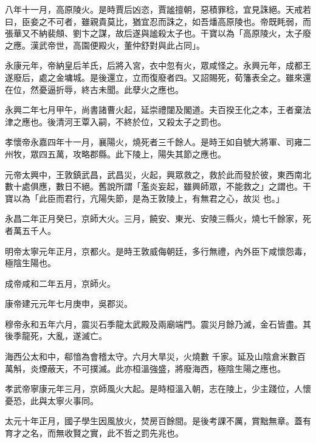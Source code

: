 \begin{pinyinscope}
 八年十一月，高原陵火。是時賈后凶恣，賈謐擅朝，惡積罪稔，宜見誅絕。天戒若曰，臣妾之不可者，雖親貴莫比，猶宜忍而誅之，如吾燔高原陵也。帝既眊弱，而張華又不納裴頠、劉卞之謀，故后遂與謐殺太子也。干寶以為「高原陵火，太子廢之應。漢武帝世，高園便殿火，董仲舒對與此占同」。



 永康元年，帝納皇后羊氏，后將入宮，衣中忽有火，眾咸怪之。永興元年，成都王遂廢后，處之金墉城。是後還立，立而復廢者四。又詔賜死，荀籓表全之。雖來還在位，然憂逼折辱，終古未聞。此孽火之應也。



 永興二年七月甲午，尚書諸曹火起，延崇禮闥及閣道。夫百揆王化之本，王者棄法津之應也。後清河王覃入嗣，不終於位，又殺太子之罰也。



 孝懷帝永嘉四年十一月，襄陽火，燒死者三千餘人。是時王如自號大將軍、司雍二州牧，眾四五萬，攻略郡縣。此下陵上，陽失其節之應也。



 元帝太興中，王敦鎮武昌，武昌災，火起，興眾救之，救於此而發於彼，東西南北數十處俱應，數日不絕。舊說所謂「濫炎妄起，雖興師眾，不能救之」之謂也。干寶以為「此臣而君行，亢陽失節，是為王敦陵上，有無君之心，故災
 也。」



 永昌二年正月癸巳，京師大火。三月，饒安、東光、安陵三縣火，燒七千餘家，死者萬五千人。



 明帝太寧元年正月，京都火。是時王敦威侮朝廷，多行無禮，內外臣下咸懷怨毒，極陰生陽也。



 成帝咸和二年五月，京師火。



 康帝建元元年七月庚申，吳郡災。



 穆帝永和五年六月，震災石季龍太武殿及兩廟端門。震災月餘乃滅，金石皆盡。其後季龍死，大亂，遂滅亡。



 海西公太和中，郗愔為會稽太守。六月大旱災，火燒數
 千家。延及山陰倉米數百萬斛，炎煙蔽天，不可撲滅。此亦桓溫強盛，將廢海西，極陰生陽之應也。



 孝武帝寧康元年三月，京師風火大起。是時桓溫入朝，志在陵上，少主踐位，人懷憂恐，此與太寧火事同。



 太元十年正月，國子學生因風放火，焚房百餘間。是後考課不厲，賞黜無章。蓋有育才之名，而無收賢之實，此不哲之罰先兆也。




\end{pinyinscope}

